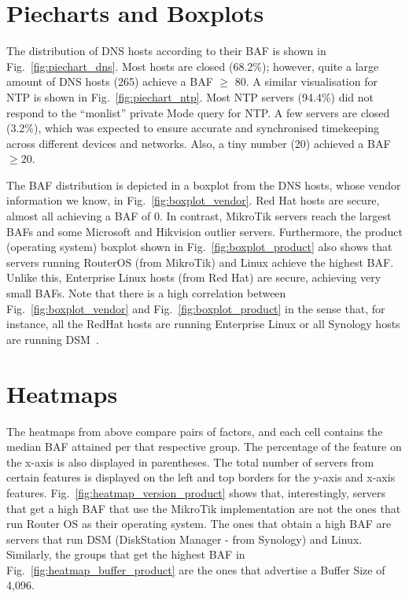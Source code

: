 \section{Piecharts and Boxplots}
\label{appendix:piecharts_boxplots}



The distribution of DNS hosts according to their BAF is shown in Fig.~\ref{fig:piechart_dns}. Most hosts are closed (68.2\%); however, quite a large amount of DNS hosts (265) achieve a BAF $\geq$ 80. A similar visualisation for NTP is shown in Fig.~\ref{fig:piechart_ntp}. Most NTP servers (94.4\%) did not respond to the ``monlist'' private Mode query for NTP. A few servers are closed (3.2\%), which was expected to ensure accurate and synchronised timekeeping across different devices and networks. Also, a tiny number (20) achieved a BAF $\geq 20$.  

The BAF distribution is depicted in a boxplot from the DNS hosts, whose vendor information we know, in Fig.~\ref{fig:boxplot_vendor}. Red Hat hosts are secure, almost all achieving a BAF of 0. In contrast, MikroTik servers reach the largest BAFs and some Microsoft and Hikvision outlier servers. Furthermore, the product (operating system) boxplot shown in Fig.~\ref{fig:boxplot_product} also shows that servers running RouterOS (from MikroTik) and Linux achieve the highest BAF. Unlike this, Enterprise Linux hosts (from Red Hat) are secure, achieving very small BAFs. Note that there is a high correlation between Fig.~\ref{fig:boxplot_vendor} and Fig.~\ref{fig:boxplot_product} in the sense that, for instance, all the RedHat hosts are running Enterprise Linux or all Synology hosts are running DSM~\cite{dsm}.


\section{Heatmaps}
\label{appendix:heatmaps}

The heatmaps from above compare pairs of factors, and each cell contains the median BAF attained per that respective group. The percentage of the feature on the x-axis is also displayed in parentheses. The total number of servers from certain features is displayed on the left and top borders for the y-axis and x-axis features. Fig.~\ref{fig:heatmap_version_product} shows that, interestingly, servers that get a high BAF that use the MikroTik implementation are not the ones that run Router OS as their operating system. The ones that obtain a high BAF are servers that run DSM (DiskStation Manager - from Synology) and Linux. Similarly, the groups that get the highest BAF in Fig.~\ref{fig:heatmap_buffer_product} are the ones that advertise a Buffer Size of 4,096.

